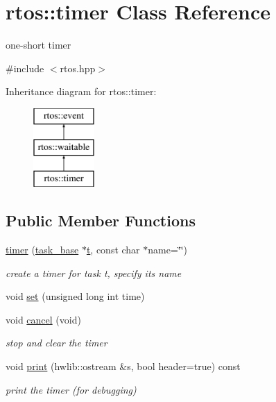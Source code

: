 \hypertarget{classrtos_1_1timer}{}\section{rtos\+:\+:timer Class Reference}
\label{classrtos_1_1timer}


one-\/short timer  




{\ttfamily \#include $<$rtos.\+hpp$>$}

Inheritance diagram for rtos\+:\+:timer\+:\begin{figure}[H]
\begin{center}
\leavevmode
\includegraphics[height=3.000000cm]{classrtos_1_1timer}
\end{center}
\end{figure}
\subsection*{Public Member Functions}
\begin{DoxyCompactItemize}
\item 
\hyperlink{classrtos_1_1timer_a6c1cdeef312f1ed2b946097ef9196483}{timer} (\hyperlink{classrtos_1_1task__base}{task\+\_\+base} $\ast$\hyperlink{classrtos_1_1event_aa83745aabc941145f00386fd63f6b557}{t}, const char $\ast$name=\char`\"{}\char`\"{})\hypertarget{classrtos_1_1timer_a6c1cdeef312f1ed2b946097ef9196483}{}\label{classrtos_1_1timer_a6c1cdeef312f1ed2b946097ef9196483}

\begin{DoxyCompactList}\small\item\em create a timer for task t, specify its name \end{DoxyCompactList}\item 
void \hyperlink{classrtos_1_1timer_a8b5641b2d3cc0a5c9b48de1e5f7d0930}{set} (unsigned long int time)
\item 
void \hyperlink{classrtos_1_1timer_ac67cee76f7fdff1e95341a805d2d9748}{cancel} (void)
\begin{DoxyCompactList}\small\item\em stop and clear the timer \end{DoxyCompactList}\item 
void \hyperlink{classrtos_1_1timer_a4f80789abed43247008431021a2525b6}{print} (hwlib\+::ostream \&s, bool header=true) const \hypertarget{classrtos_1_1timer_a4f80789abed43247008431021a2525b6}{}\label{classrtos_1_1timer_a4f80789abed43247008431021a2525b6}

\begin{DoxyCompactList}\small\item\em print the timer (for debugging) \end{DoxyCompactList}\end{DoxyCompactItemize}
